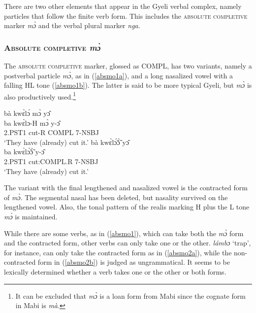 There are two other elements that appear in the Gyeli verbal complex, namely particles that follow the finite verb form. This includes the \textsc{absolute completive} marker {\itshape mɔ̀} and the verbal plural marker {\itshape nga}.

\subsubsection{\textsc{Absolute completive} {\itshape mɔ̀}}
\label{sec:mo}

The \textsc{absolute completive} marker, glossed as COMPL, has two variants, namely a postverbal particle {\itshape mɔ̀}, as in (\ref{absmo1a}), and a long nasalized vowel with a falling HL tone (\ref{absmo1b}). The latter is said to be more typical Gyeli, but {\itshape mɔ̀} is also productively used.\footnote{It can be excluded that {\itshape mɔ̀} is a loan form from Mabi since the cognate form in Mabi is {\itshape mà}.}


\begin{exe} 
\ex\label{absmo1}
\begin{xlist} 
\ex\label{absmo1a}
  \glll    bà kwɛ̀lɔ́ mɔ̀ yɔ̂  \\
           ba kwɛ̀lɔ-H mɔ̀  y-ɔ̂ \\
             2.PST1  cut-R COMPL 7-NSBJ  \\
    \trans `They have (already) cut it.'
\ex\label{absmo1b}
  \glll    bà kwɛ̀lɔ̃́ɔ̃̀ yɔ̂ \\
          ba kwɛ̀lɔ̃́ɔ̃̀ y-ɔ̂   \\
             2.PST1 cut:COMPL.R 7-NSBJ    \\
    \trans `They have (already) cut it.'
\end{xlist}
\end{exe}

\noindent The variant with the final lengthened and nasalized vowel is the contracted form of {\itshape mɔ̀}. The segmental nasal has been deleted, but nasality survived on the lengthened vowel. Also, the tonal pattern of the realis marking H plus the L tone {\itshape mɔ̀} is maintained.

While there are some verbs, as in (\ref{absmo1}), which can take both the {\itshape mɔ̀} form and the contracted form, other verbs can only take one or the other. {\itshape lámbɔ} `trap', for instance, can only take the contracted form as in (\ref{absmo2a}), while the non-contracted form in (\ref{absmo2b}) is judged as ungrammatical. It seems to be lexically determined whether a verb takes one or the other or both forms. 

